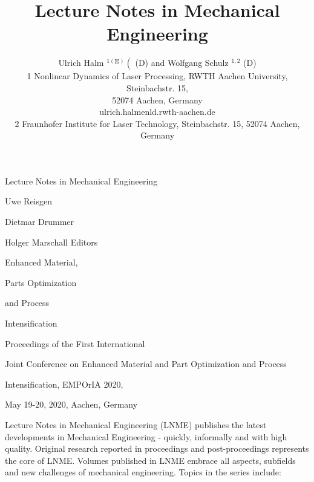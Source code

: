 \documentclass[10pt]{article}
\title{Lecture Notes in Mechanical Engineering }
\author{Ulrich Halm ${ }^{1(\boxtimes)}\left(\right.$ (D) and Wolfgang Schulz ${ }^{1,2}$ (D)\\
1 Nonlinear Dynamics of Laser Processing, RWTH Aachen University, Steinbachstr. 15,\\
52074 Aachen, Germany\\
ulrich.halmenld.rwth-aachen.de\\
2 Fraunhofer Institute for Laser Technology, Steinbachstr. 15, 52074 Aachen, Germany}
\date{}
\begin{document}
\maketitle
Lecture Notes in Mechanical Engineering

Uwe Reisgen

Dietmar Drummer

Holger Marschall Editors

Enhanced Material,

Parts Optimization

and Process

Intensification

Proceedings of the First International

Joint Conference on Enhanced Material and Part Optimization and Process

Intensification, EMPOrIA 2020,

May 19-20, 2020, Aachen, Germany

Lecture Notes in Mechanical Engineering (LNME) publishes the latest developments in Mechanical Engineering - quickly, informally and with high quality. Original research reported in proceedings and post-proceedings represents the core of LNME. Volumes published in LNME embrace all aspects, subfields and new challenges of mechanical engineering. Topics in the series include:
\end{document}
